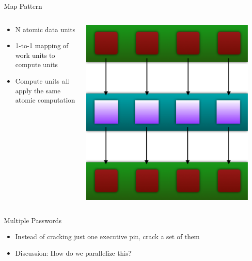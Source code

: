 \documentclass[xcolor=dvipsnames]{beamer}
\begin{document}
  \begin{frame}{Map Pattern}
		\begin{columns}
			\begin{column}{0.5\textwidth}
				\begin{itemize}
					\item N atomic data units
					\item 1-to-1 mapping of work units to compute units
					\item Compute units all apply the same atomic computation
				\end{itemize}
			\end{column}
			\begin{column}{0.5\textwidth}
				\includegraphics[width=\textwidth]{images/mapPattern}
			\end{column}
		\end{columns}
	\end{frame}
	
	
	\begin{frame}{Multiple Passwords}
		\begin{itemize}
			\item Instead of cracking just one executive pin, crack a set of them
			\item Discussion: How do we parallelize this?
		\end{itemize}
	\end{frame}
	
\end{document}
